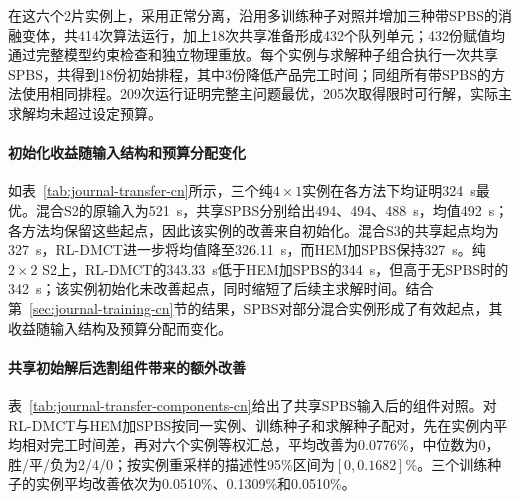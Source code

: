 在这六个2片实例上，采用正常分离，沿用多训练种子对照并增加三种带SPBS的消融变体，共414次算法运行，加上18次共享准备形成432个队列单元；432份赋值均通过完整模型约束检查和独立物理重放。每个实例与求解种子组合执行一次共享SPBS，共得到18份初始排程，其中3份降低产品完工时间；同组所有带SPBS的方法使用相同排程。209次运行证明完整主问题最优，205次取得限时可行解，实际主求解均未超过设定预算。

\paragraph{初始化收益随输入结构和预算分配变化}

如表~\ref{tab:journal-transfer-cn}所示，三个纯$4\times1$实例在各方法下均证明324~s最优。混合S2的原输入为521~s，共享SPBS分别给出494、494、488~s，均值492~s；各方法均保留这些起点，因此该实例的改善来自初始化。混合S3的共享起点均为327~s，RL-DMCT进一步将均值降至326.11~s，而HEM加SPBS保持327~s。纯$2\times2$ S2上，RL-DMCT的343.33~s低于HEM加SPBS的344~s，但高于无SPBS时的342~s；该实例初始化未改善起点，同时缩短了后续主求解时间。结合第~\ref{sec:journal-training-cn}节的结果，SPBS对部分混合实例形成了有效起点，其收益随输入结构及预算分配而变化。

\paragraph{共享初始解后选割组件带来的额外改善}

表~\ref{tab:journal-transfer-components-cn}给出了共享SPBS输入后的组件对照。对RL-DMCT与HEM加SPBS按同一实例、训练种子和求解种子配对，先在实例内平均相对完工时间差，再对六个实例等权汇总，平均改善为0.0776\%，中位数为0，胜/平/负为2/4/0；按实例重采样的描述性95\%区间为$[0,0.1682]\%$。三个训练种子的实例平均改善依次为0.0510\%、0.1309\%和0.0510\%。

\begin{table}[!htbp]
\centering\small
\caption{共享SPBS输入的组件对照（产品完工均值，s）}
\label{tab:journal-transfer-components-cn}
\end{table}

